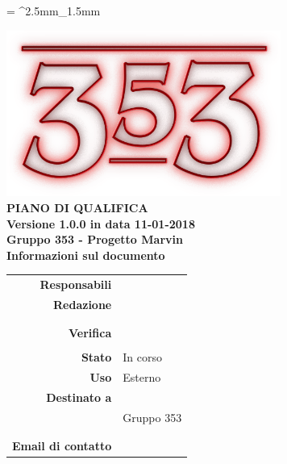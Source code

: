 \documentclass[openany, a4paper, 12pt]{report}
\begin{document}
	
	\tabulinesep = ^2.5mm_1.5mm
	
	\begin{titlepage}
		\centering
		\vfill
		{
			\bfseries
			\vskip2cm
			\includegraphics[width=9cm]{../../common/images/logo.png} \\
			\vfill
			\Huge{PIANO DI QUALIFICA}\\
			\vfill
			\Large Versione 1.0.0 in data 11-01-2018\\
			\large Gruppo 353 - Progetto Marvin\\
			\vfill
			\normalsize Informazioni sul documento\\
			\begin{table}[htbp]
				\centering
				\renewcommand\arraystretch{1.2}
				\begin{tabular}{r|l}
					\hline
					\textbf{Responsabili}	& \Parwinder \\
					
					\textbf{Redazione} 		& \Elena \\
											& \Gianluca \\
											& \Valentina \\
											
					\textbf{Verifica} 		& \Riccardo \\	
											& \Davide \\
											
					\textbf{Stato} 			& In corso\\
					\textbf{Uso}			& Esterno\\
					\textbf{Destinato a}   	& \Proponente\\
					& Gruppo 353\\
					& \Vardanega\\
					& \Cardin\\
					
					\textbf{Email di contatto}	& \mailgroup
				\end{tabular}
			\end{table}
			\vfill
		}    
	\end{titlepage}
	
	\tableofcontents
	\listoffigures
	\listoftables
	\newpage
	
	
	
	
	
	
	
	
	
	
	\appendix
	
	
	
\end{document}
